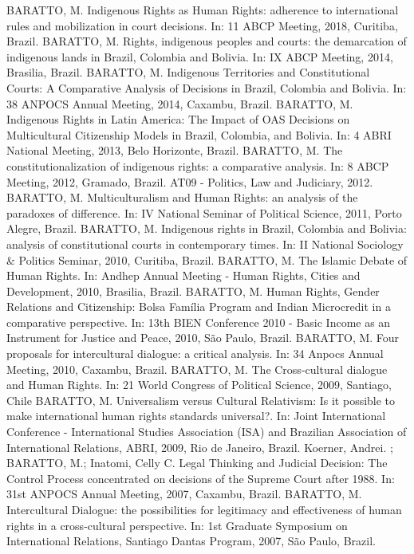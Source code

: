 \begin{cvcitems}
  \cvcitem
      {BARATTO, M.}
      {Indigenous Rights as Human Rights: adherence to international rules and mobilization in court decisions. In: 11 ABCP Meeting, 2018, Curitiba, Brazil.}
  \cvcitem
      {BARATTO, M.}
      {Rights, indigenous peoples and courts: the demarcation of indigenous lands in Brazil, Colombia and Bolivia. In: IX ABCP Meeting, 2014, Brasilia, Brazil.}
  \cvcitem
      {BARATTO, M.}
      {Indigenous Territories and Constitutional Courts: A Comparative Analysis of Decisions in Brazil, Colombia and Bolivia. In: 38 ANPOCS Annual Meeting, 2014, Caxambu, Brazil.}
  \cvcitem
      {BARATTO, M.}
      {Indigenous Rights in Latin America: The Impact of OAS Decisions on Multicultural Citizenship Models in Brazil, Colombia, and Bolivia. In: 4 ABRI National Meeting, 2013, Belo Horizonte, Brazil.}
  \cvcitem
      {BARATTO, M.}
      {The constitutionalization of indigenous rights: a comparative analysis. In: 8 ABCP Meeting, 2012, Gramado, Brazil. AT09 - Politics, Law and Judiciary, 2012.}
  \cvcitem
      {BARATTO, M.}
      {Multiculturalism and Human Rights: an analysis of the paradoxes of difference. In: IV National Seminar of Political Science, 2011, Porto Alegre, Brazil.}
  \cvcitem
      {BARATTO, M.}
      {Indigenous rights in Brazil, Colombia and Bolivia: analysis of constitutional courts in contemporary times. In: II National Sociology \& Politics Seminar, 2010, Curitiba, Brazil.}
  \cvcitem
      {BARATTO, M.}
      {The Islamic Debate of Human Rights. In: Andhep Annual Meeting - Human Rights, Cities and Development, 2010, Brasilia, Brazil.}
  \cvcitem
      {BARATTO, M.}
      {Human Rights, Gender Relations and Citizenship: Bolsa Família Program and Indian Microcredit in a comparative perspective. In: 13th BIEN Conference 2010 - Basic Income as an Instrument for Justice and Peace, 2010, São Paulo, Brazil.}
  \cvcitem
      {BARATTO, M.}
      {Four proposals for intercultural dialogue: a critical analysis. In: 34 Anpocs Annual Meeting, 2010, Caxambu, Brazil.}
  \cvcitem
      {BARATTO, M.}
      {The Cross-cultural dialogue and Human Rights. In: 21 World Congress of Political Science, 2009, Santiago, Chile}
  \cvcitem
      {BARATTO, M.}
      {Universalism versus Cultural Relativism: Is it possible to make international human rights standards universal?. In: Joint International Conference - International Studies Association (ISA) and Brazilian Association of International Relations, ABRI, 2009, Rio de Janeiro, Brazil.}
  \cvcitem
      {Koerner, Andrei. ; BARATTO, M.; Inatomi, Celly C.}
      {Legal Thinking and Judicial Decision: The Control Process concentrated on decisions of the Supreme Court after 1988. In: 31st ANPOCS Annual Meeting, 2007, Caxambu, Brazil.}
  \cvcitem
      {BARATTO, M.}
      {Intercultural Dialogue: the possibilities for legitimacy and effectiveness of human rights in a cross-cultural perspective. In: 1st Graduate Symposium on International Relations, Santiago Dantas Program, 2007, São Paulo, Brazil.}
\end{cvcitems}

